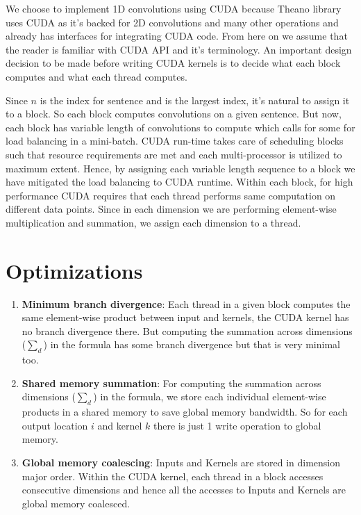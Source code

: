\documentclass{article}
\begin{document}
We choose to implement 1D convolutions using CUDA because Theano library uses CUDA as it's backed for 2D convolutions and many other operations and already has interfaces for integrating CUDA code. From here on we assume that the reader is familiar with CUDA API and it's terminology. An important design decision to be made before writing CUDA kernels is to decide what each block computes and what each thread computes. 

Since $n$ is the index for sentence and is the largest index, it's natural to assign it to a block. So each block computes convolutions on a given sentence. But now, each block has variable length of convolutions to compute which calls for some for load balancing in a mini-batch. CUDA run-time takes care of scheduling blocks such that resource requirements are met and each multi-processor is utilized to maximum extent. Hence, by assigning each variable length sequence to a block we have mitigated the load balancing to CUDA runtime. Within each block, for high performance CUDA requires that each thread performs same computation on different data points. Since in each dimension we are performing element-wise multiplication and summation, we assign each dimension to a thread. 

\section*{Optimizations}

\begin{enumerate}
\item \textbf{Minimum branch divergence}: Each thread in a given block computes the same element-wise product between input and kernels, the CUDA kernel has no branch divergence there. But computing the summation across dimensions ($\sum_d$) in the formula has some branch divergence but that is very minimal too.

\item \textbf{Shared memory summation}: For computing the summation across dimensions ($\sum_d$) in the formula, we store each individual element-wise products in a shared memory to save global memory bandwidth. So for each output location $i$ and kernel $k$ there is just 1 write operation to global memory.

\item \textbf{Global memory coalescing}: Inputs and Kernels are stored in dimension major order. Within the CUDA kernel, each thread in a block accesses consecutive dimensions and hence all the accesses to Inputs and Kernels are global memory coalesced.  

\end{enumerate}
\end{document}
